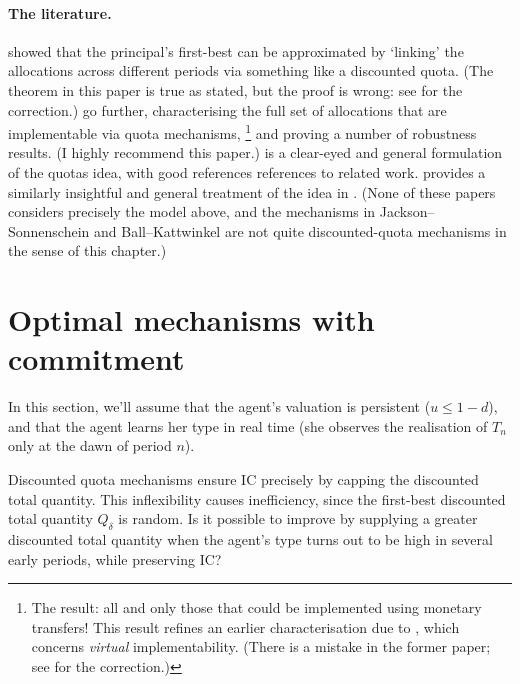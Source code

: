 \paragraph{The literature.}
\textcite{JacksonSonnenschein2007} showed that the principal's first-best can be approximated by `linking' the allocations across different periods via something like a discounted quota.
(The theorem in this paper is true as stated, but the proof is wrong: see \textcite{BallJacksonKattwinkel2022} for the correction.)
\textcite{BallKattwinkel2023} go further, characterising the full set of allocations that are implementable via quota mechanisms,%
	\footnote{The result: all and only those that could be implemented using monetary transfers! This result refines an earlier characterisation due to \textcite{MatsushimaMiyazakiYagi2010,Ishii2016}, which concerns \emph{virtual} implementability. (There is a mistake in the former paper; see \textcite{BallKattwinkel2023comment} for the correction.)}
and proving a number of robustness results. (I highly recommend this paper.)
\textcite{Frankel2016jet} is a clear-eyed and general formulation of the quotas idea, with good references references to related work.
\textcite{Frankel2016aej} provides a similarly insightful and general treatment of the idea in .
(None of these papers considers precisely the model above,
and the mechanisms in Jackson--Sonnenschein and Ball--Kattwinkel are not quite discounted-quota mechanisms in the sense of this chapter.)



\section{Optimal mechanisms with commitment}
\label{sec:ch3:guohorner}

In this section, we'll assume that the agent's valuation is persistent ($u \leq 1-d$),
and that the agent learns her type in real time (she observes the realisation of $T_n$ only at the dawn of period $n$).

Discounted quota mechanisms ensure IC
precisely by capping the discounted total quantity.
This inflexibility causes inefficiency, since the first-best discounted total quantity $Q_\delta$ is random.
Is it possible to improve by supplying a greater discounted total quantity when the agent's type turns out to be high in several early periods, while preserving IC?

